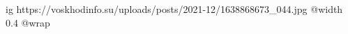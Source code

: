  
 
 
 
 

\ifcmt
  ig https://voskhodinfo.su/uploads/posts/2021-12/1638868673_044.jpg
  @width 0.4
  @wrap 
\fi
